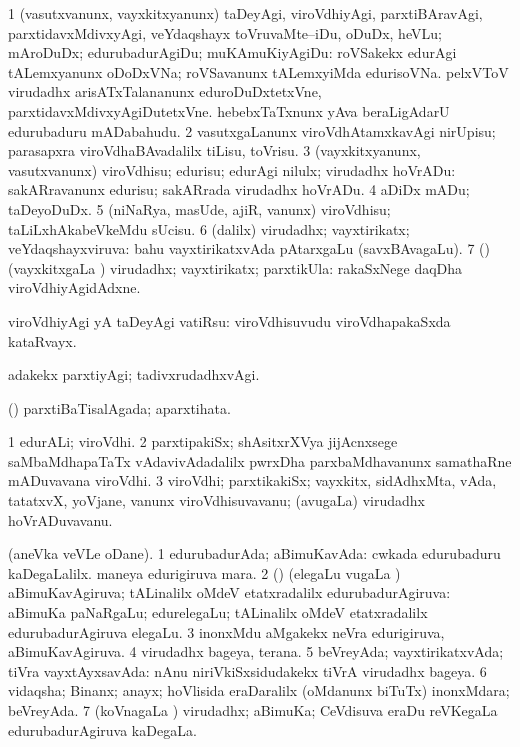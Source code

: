 \bentry
{}
\gl{\sakirx}
\bmng
\bnum
\num{1} (vasutxvanunx, vayxkitxyanunx) taDeyAgi, viroVdhiyAgi, parxtiBAravAgi, parxtidavxMdivxyAgi, veYdaqshayx toVruvaMte--iDu, oDuDx, heVLu; mAroDuDx; edurubadurAgiDu; muKAmuKiyAgiDu:  roVSakekx edurAgi tALemxyanunx oDoDxVNa; roVSavanunx tALemxyiMda edurisoVNa.  pelxVToV virudadhx arisATxTalananunx eduroDuDxtetxVne, parxtidavxMdivxyAgiDutetxVne.  hebebxTaTxnunx yAva beraLigAdarU edurubaduru mADabahudu. 
\num{2} vasutxgaLanunx viroVdhAtamxkavAgi nirUpisu; parasapxra viroVdhaBAvadalilx tiLisu, toVrisu. 
\num{3} (vayxkitxyanunx, vasutxvanunx) viroVdhisu; edurisu; edurAgi nilulx; virudadhx hoVrADu:  sakARravanunx edurisu; sakARrada virudadhx hoVrADu. 
\num{4} aDiDx mADu; taDeyoDuDx. 
\num{5} (niNaRya, masUde, ajiR, \mo vanunx) viroVdhisu; taLiLxhAkabeVkeMdu sUcisu. 
\num{6} (\BUkaq dalilx) virudadhx; vayxtirikatx; veYdaqshayxviruva:  bahu vayxtirikatxvAda pAtarxgaLu (savxBAvagaLu). 
\num{7} (\BUkaq) (vayxkitxgaLa \vi) virudadhx; vayxtirikatx; parxtikUla:  rakaSxNege daqDha viroVdhiyAgidAdxne. 
\enum
\emng

\noindent
\gl{\akirx}
\bmng
viroVdhiyAgi yA taDeyAgi vatiRsu:  viroVdhisuvudu viroVdhapakaSxda kataRvayx. 
\emng

\noindent
\gl{\pagu}
\bmng
{} adakekx parxtiyAgi; tadivxrudadhxvAgi. 
\emng
\eentry

\bentry
{}
\gl{\gu}
\bmng
(\kAparx) parxtiBaTisalAgada; aparxtihata. 
\emng
\eentry

\bentry
{}
\gl{\nA}
\bmng
\bnum
\num{1} edurALi; viroVdhi. 
\num{2} parxtipakiSx; shAsitxrXVya jijAcnxsege saMbaMdhapaTaTx vAdavivAdadalilx pwrxDha parxbaMdhavanunx samathaRne mADuvavana viroVdhi. 
\num{3} viroVdhi; parxtikakiSx; vayxkitx, sidAdhxMta, vAda, tatatxvX, yoVjane, \mo vanunx viroVdhisuvavanu; (avugaLa) virudadhx hoVrADuvavanu. 
\enum
\emng
\eentry

\bentry
{}
\gl{\gu}
\bmng
(aneVka veVLe  oDane). 
\bnum
\num{1} edurubadurAda; aBimuKavAda:  cwkada edurubaduru kaDegaLalilx.  maneya edurigiruva mara. 
\num{2} (\savi) (elegaLu \mo vugaLa \vi) aBimuKavAgiruva; tALinalilx oMdeV etatxradalilx edurubadurAgiruva:  aBimuKa paNaRgaLu; edurelegaLu; tALinalilx oMdeV etatxradalilx edurubadurAgiruva elegaLu. 
\num{3} inonxMdu aMgakekx neVra edurigiruva, aBimuKavAgiruva. 
\num{4} virudadhx bageya, terana. 
\num{5} beVreyAda; vayxtirikatxvAda; tiVra vayxtAyxsavAda:  nAnu niriVkiSxsidudakekx tiVrA virudadhx bageya. 
\num{6} vidaqsha; Binanx; anayx; hoVlisida eraDaralilx (oMdanunx biTuTx) inonxMdara; beVreyAda. 
\num{7} (koVnagaLa \vi) virudadhx; aBimuKa; CeVdisuva eraDu reVKegaLa edurubadurAgiruva kaDegaLa. 
\enum
\emng

